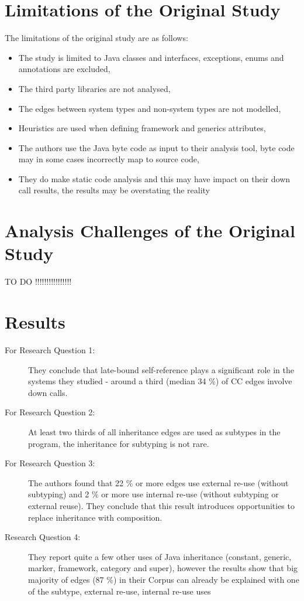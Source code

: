 \documentclass{uvamscse}
\begin{document}
\section{Limitations of the Original Study}
The limitations of the original study are as follows: 
\begin{itemize}
\item The study is limited to Java classes and interfaces, exceptions, enums and annotations are excluded,
\item The third party libraries are not analysed,
\item The edges between system types and non-system types are not modelled,
\item Heuristics are used when defining framework and generics attributes,
\item The authors use the Java byte code as input to their analysis tool, byte code may in some cases incorrectly map to source code,
\item They do make static code analysis and this may have impact on their down call results, the results may be overstating the reality
\end{itemize}


\section{Analysis Challenges of the Original Study} \label{OriginalChallenges}
TO DO !!!!!!!!!!!!!!!!




\section{Results} \label{OriginalResults}

\begin{description}
\item [For Research Question 1:] They conclude that late-bound self-reference plays a significant role in the systems they studied - around a third (median 34 \%) of CC edges involve down calls.

\item [For Research Question 2:] At least two thirds of all inheritance edges are used as subtypes in the program, the inheritance for subtyping is not rare.

\item[For Research Question 3:] The authors found that 22 \% or more edges use external re-use (without subtyping) and 2 \% or more use internal re-use (without subtyping or external reuse). They conclude that this result introduces opportunities to replace inheritance with composition. 


\item[Research Question 4:] They report quite a few other uses of Java inheritance (constant, generic, marker, framework, category and super), however the results show that big majority of edges (87 \%) in their Corpus can already be explained with one of the subtype, external re-use, internal re-use uses 

\end{description}
\end{document}
